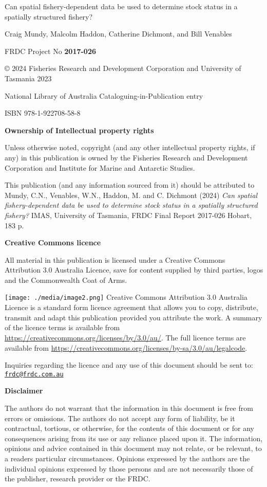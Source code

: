 

Can spatial fishery-dependent data be used to determine stock status in a spatially structured fishery?

Craig Mundy, Malcolm Haddon, Catherine Dichmont, and Bill Venables


FRDC Project No \textbf{2017-026}


© 2024 Fisheries Research and Development Corporation and University of Tasmania 2023

National Library of Australia Cataloguing-in-Publication entry

ISBN 978-1-922708-58-8


\textbf{Ownership of Intellectual property rights}

Unless otherwise noted, copyright (and any other intellectual property rights, if any) in this publication is owned by the Fisheries Research and Development Corporation and Institute for Marine and Antarctic Studies.

This publication (and any information sourced from it) should be attributed to Mundy, C.N., Venables, W.N., Haddon, M. and C. Dichmont (2024) \emph{Can
spatial fishery-dependent data be used to determine stock status in a spatially structured fishery?} IMAS, University of Tasmania, FRDC Final Report 2017-026 Hobart, 183 p. 

\textbf{Creative Commons licence}

All material in this publication is licensed under a Creative Commons Attribution 3.0 Australia Licence, save for content supplied by third parties, logos and the Commonwealth Coat of Arms.

\texttt{[image: ./media/image2.png]}
Creative Commons Attribution 3.0 Australia Licence is a standard form licence agreement that allows you to copy, distribute, transmit and adapt this publication provided you attribute the work. A summary of the licence terms is available from
\url{https://creativecommons.org/licenses/by/3.0/au/}. The full licence
terms are available from \url{https://creativecommons.org/licenses/by-sa/3.0/au/legalcode}.

Inquiries regarding the licence and any use of this document should be sent to: \href{mailto:frdc@frdc.com.au}{\nolinkurl{frdc@frdc.com.au}}

\textbf{Disclaimer}

The authors do not warrant that the information in this document is free from errors or omissions. The authors do not accept any form of liability, be it contractual, tortious, or otherwise, for the contents of this document or for any consequences arising from its use or any reliance placed upon it. The information, opinions and advice contained in this document may not relate, or be relevant, to a readers particular circumstances. Opinions expressed by the authors are the individual opinions expressed by those persons and are not necessarily those of the publisher, research provider or the FRDC.

